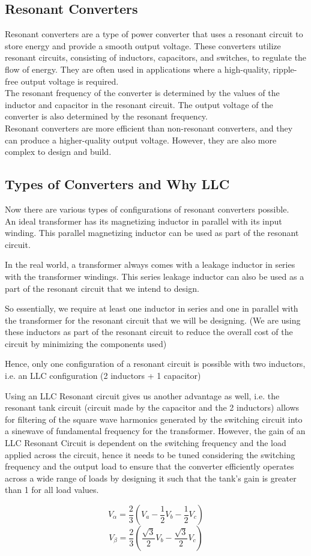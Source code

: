 \subsection{Resonant Converters}
Resonant converters are a type of power converter that uses a resonant circuit to store energy and provide a smooth output voltage. These converters utilize resonant circuits, consisting of inductors, capacitors, and switches, to regulate the flow of energy. They are often used in applications where a high-quality, ripple-free output voltage is required.\\
The resonant frequency of the converter is determined by the values of the inductor and capacitor in the resonant circuit. The output voltage of the converter is also determined by the resonant frequency.\\
Resonant converters are more efficient than non-resonant converters, and they can produce a higher-quality output voltage. However, they are also more complex to design and build.

\subsection{Types of Converters and Why LLC}
Now there are various types of configurations of resonant converters possible.\\
\noindent
An ideal transformer has its magnetizing inductor in parallel with its input winding. This parallel magnetizing inductor can be used as part of the resonant circuit.

In the real world, a transformer always comes with a leakage inductor in series with the transformer windings. This series leakage inductor can also be used as a part of the resonant circuit that we intend to design.

So essentially, we require at least one inductor in series and one in parallel with the transformer for the resonant circuit that we will be designing. (We are using these inductors as part of the resonant circuit to reduce the overall cost of the circuit by minimizing the components used)

Hence, only one configuration of a resonant circuit is possible with two inductors, i.e. an LLC configuration (2 inductors + 1 capacitor)

Using an LLC Resonant circuit gives us another advantage as well, i.e. the resonant tank circuit (circuit made by the capacitor and the 2 inductors) allows for filtering of the square wave harmonics generated by the switching circuit into a sinewave of fundamental frequency for the transformer.
However, the gain of an LLC Resonant Circuit is dependent on the switching frequency and the load applied across the circuit, hence it needs to be tuned considering the switching frequency and the output load to ensure that the converter efficiently operates across a wide range of loads by designing it such that the tank’s gain is greater than 1 for all load values.



\begin{equation*}
    V_\alpha = \frac{2}{3}(V_a - \frac{1}{2} V_b - \frac{1}{2} V_c)
\end{equation*}
\begin{equation*}
    V_\beta = \frac{2}{3}(\frac{\sqrt{3}}{2} V_b - \frac{\sqrt{3}}{2} V_c)
\end{equation*}
